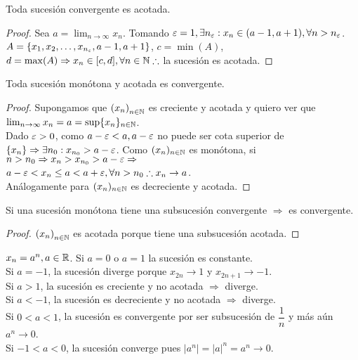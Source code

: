 \begin{theorem}
  Toda sucesión convergente es acotada.
  \begin{proof}
    Sea \(a = \lim_{n \to \infty} x_n\). Tomando \(\varepsilon = 1, \exists n_{\varepsilon} : x_n \in (a - 1, a+1), \forall n > n_{\varepsilon} \). \\
    \(A = \{ x_1, x_2, \ldots, x_{n_{\varepsilon}}, a-1, a+1 \} \), \(c = \min(A)\), \(d = \max(A) \Rightarrow x_n \in [c, d], \forall n \in \mathbb{N} \therefore \) la sucesión es acotada.
  \end{proof}
\end{theorem}

\begin{theorem}
  Toda sucesión monótona y acotada es convergente.
  \begin{proof}
    Supongamos que \( {(x_n)}_{n \in \mathbb{N}} \) es creciente y acotada y quiero ver que \( \lim_{n \to \infty} x_n = a = \sup \{ x_n \}_{n \in \mathbb{N}} \). \\
    Dado \(\varepsilon > 0\), como \(a-\varepsilon < a, a-\varepsilon \) no puede ser cota superior de \( \{x_n\} \Rightarrow \exists n_0 : x_{n_0} > a - \varepsilon \).
    Como \(( x_n)_{n \in \mathbb{N}} \) es monótona, si \(n > n_0 \Rightarrow x_n > x_{n_0} > a - \varepsilon \Rightarrow \) \\
    \(a-\varepsilon < x_n \leq a < a+\varepsilon, \forall n > n_0 \therefore x_n \to a\). \\
    Análogamente para \( ( x_n )_{n \in \mathbb{N}} \) es decreciente y acotada.
  \end{proof}
\end{theorem}

\begin{corollary}
  Si una sucesión monótona tiene una subsucesión convergente \(\Rightarrow \) es convergente.
  \begin{proof}
    \({(x_n)}_{n \in \mathbb{N}} \) es acotada porque tiene una subsucesión acotada.
  \end{proof}
\end{corollary}

\begin{eg}
  \(x_n = a^n, a \in \mathbb{R} \). Si \(a=0\) o \(a = 1\) la sucesión es constante. \\
  Si \(a = -1\), la sucesión diverge porque \(x_{2n} \to 1\) y \(x_{2n+1} \to -1\). \\
  Si \(a > 1\), la sucesión es creciente y no acotada \(\Rightarrow \) diverge. \\
  Si \(a < -1\), la sucesión es decreciente y no acotada \(\Rightarrow \) diverge. \\
  Si \(0 < a < 1\), la sucesión es convergente por ser subsucesión de \(\dfrac{1}{n} \) y más aún \(a^n \to 0\). \\
  Si \(-1 < a < 0\), la sucesión converge pues \(|a^n| = |a|^n = a^n \to 0\).
\end{eg}

